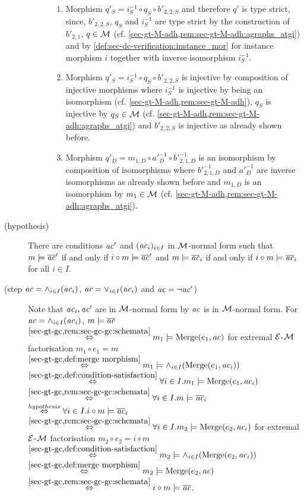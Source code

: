 \begin{description}
\begin{description}
\begin{enumerate}
  \item Morphism $q'_S=i^{-1}_S \circ q_S \circ b'_{2,2,S}$ and therefore $q'$ is type strict, since, $b'_{2,2,S}$, $q_S$ and $i^{-1}_S$ are type strict by the construction of $b'_{2,1}$, $q \in {\cal M}$ (cf. \cref{sec-gt-M-adh,rem:sec-gt-M-adh:agraphs_atgi}) and by \cref{def:sec-dc-verification:instance_mor} for instance morphism $i$ together with inverse isomorphism $i^{-1}_S$.
  \item Morphism $q'_S=i^{-1}_S \circ q_S \circ b'_{2,2,S}$ is injective by composition of injective morphisms where $i^{-1}_S$ is injective by being an isomorphism (cf. \cref{sec-gt-M-adh,rem:sec-gt-M-adh}), $q_S$ is injective by $q_S \in {\cal M}$ (cf. \cref{sec-gt-M-adh,rem:sec-gt-M-adh:agraphs_atgi}) and $b'_{2,2,S}$ is injective as already shown before.
  \item Morphism $q'_D=m_{1,D} \circ a'^{-1}_D \circ b'^{-1}_{2,1,D}$ is an isomorphism by composition of isomorphisms where $b'^{-1}_{2,1,D}$ and $a'^{-1}_D$ are inverse isomorphisms as already shown before and $m_{1,D}$ is an isomorphism by $m_1 \in {\cal M}$ (cf. \cref{sec-gt-M-adh,rem:sec-gt-M-adh:agraphs_atgi}).
\end{enumerate}
\end{description}
\item[(hypothesis)] There are conditions $\mathit{ac}'$ and $(\mathit{ac}_i)_{i \in I}$ in ${\cal M}$-normal form such that $m \models \overline{\mathit{ac}}'$ if and only if $i \circ m\models \overline{\mathit{ac}}'$ and $m \models \overline{\mathit{ac}}_i$ if and only if $i \circ m\models \overline{\mathit{ac}}_i$ for all $i \in I$.
\item[(step $\mathit{ac}=\wedge_{i \in I}(\mathit{ac}_i)$, $\mathit{ac}=\vee_{i \in I}(\mathit{ac}_i)$ and $\mathit{ac}=\neg \mathit{ac}'$)] Note that $\mathit{ac}_i,\mathit{ac}'$ are in ${\cal M}$-normal form by $\mathit{ac}$ is in ${\cal M}$-normal form.
For $\mathit{ac}=\wedge_{i \in I}(\mathit{ac}_i)$, $m \models \overline{\mathit{ac}}$ $\stackrel{\cref{sec-gt-gc,rem:sec-gc-gc:schemata}}{\Leftrightarrow} m_1 \models \Merge(e_1,\ac)$ for extremal $\mathcal{E}$-${\cal M}$ factorisation $m_1 \circ e_1=m$ $\stackrel{\cref{sec-gt-gc,def:merge morphism}}{\Leftrightarrow} m_1 \models \wedge_{i \in I}(\Merge(e_1,\ac_i))$ $\stackrel{\cref{sec-gt-gc,def:condition-satisfaction}}{\Leftrightarrow} \forall i \in I.m_1 \models \Merge(e_1,\ac_i)$ $\stackrel{\cref{sec-gt-gc,rem:sec-gc-gc:schemata}}{\Leftrightarrow} \forall i \in I.m \models \ol{\ac}_i$ $\stackrel{hypothesis}{\Leftrightarrow} \forall i \in I.i \circ m \models \overline{\mathit{ac}}_i$
$\stackrel{\cref{sec-gt-gc,rem:sec-gc-gc:schemata}}{\Leftrightarrow} \forall i \in I.m_2 \models \Merge(e_2,\ac_i)$ for extremal $\mathcal{E}$-${\cal M}$ factorisation $m_2 \circ e_2=i \circ m$ $\stackrel{\cref{sec-gt-gc,def:condition-satisfaction}}{\Leftrightarrow} m_2 \models \wedge_{i \in I}(\Merge(e_2,\ac_i))$ $\stackrel{\cref{sec-gt-gc,def:merge morphism}}{\Leftrightarrow} m_2 \models \Merge(e_2,\ac)$ $\stackrel{\cref{sec-gt-gc,rem:sec-gc-gc:schemata}}{\Leftrightarrow} i \circ m \models \ol{\ac}$.

\end{description}
